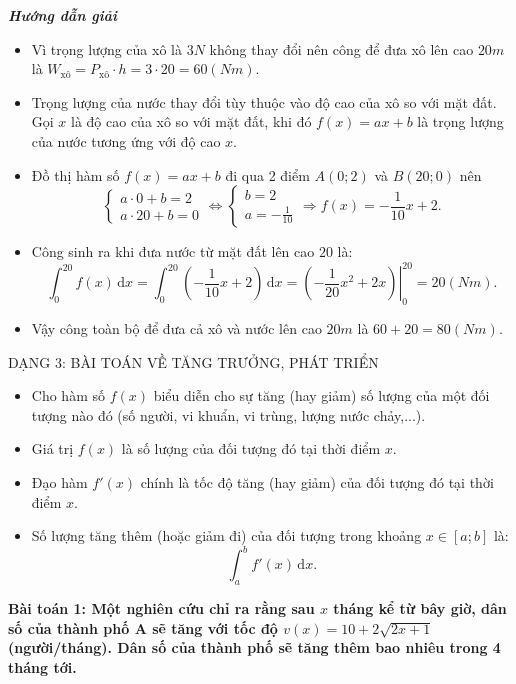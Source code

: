 \documentclass[12pt,a4paper]{article}
\newcommand{\dd}{\,\mathrm{d}}
\newcommand{\solution}{\begin{center}\textbf{\textit{Hướng dẫn giải}}\end{center}\par}
\begin{document}
\solution
\begin{itemize}
\item Vì trọng lượng của xô là $3N$ không thay đổi nên công để đưa xô lên cao $20m$ là
$W_{\text{xô}}=P_{\text{xô}}\cdot h=3\cdot20=60(Nm)$.
\item Trọng lượng của nước thay đổi tùy thuộc vào độ cao của xô so với mặt đất. Gọi $x$ là độ cao của xô so với mặt đất, khi đó $f(x)=ax+b$ là trọng lượng của nước tương ứng với độ cao $x$.
\item Đồ thị hàm số $f(x)=ax+b$ đi qua 2 điểm $A(0;2)$ và $B(20;0)$ nên
\[
\begin{cases}a\cdot0+b=2\\a\cdot20+b=0\end{cases}
\Longleftrightarrow
\begin{cases}b=2\\a=-\frac1{10}\end{cases}
\Rightarrow f(x)=-\frac1{10}x+2.
\]
\item Công sinh ra khi đưa nước từ mặt đất lên cao $20$ là:
\[
\int_0^{20}f(x)\dd x=\int_0^{20}\left(-\frac1{10}x+2\right)\dd x
=\left.\left(-\frac1{20}x^2+2x\right)\right|_0^{20}=20(Nm).
\]
\item Vậy công toàn bộ để đưa cả xô và nước lên cao $20m$ là $60+20=80(Nm)$.
\end{itemize}

\begin{dangbox}DẠNG 3: BÀI TOÁN VỀ TĂNG TRƯỞNG, PHÁT TRIỂN\end{dangbox}

\begin{itemize}
\item Cho hàm số $f(x)$ biểu diễn cho sự tăng (hay giảm) số lượng của một đối tượng nào đó
(số người, vi khuẩn, vi trùng, lượng nước chảy,...).
\item Giá trị $f(x)$ là số lượng của đối tượng đó tại thời điểm $x$.
\item Đạo hàm $f'(x)$ chính là tốc độ tăng (hay giảm) của đối tượng đó tại thời điểm $x$.
\item Số lượng tăng thêm (hoặc giảm đi) của đối tượng trong khoảng $x\in[a;b]$ là:
\[
\int_a^b f'(x)\dd x.
\]
\end{itemize}

\textbf{Bài toán 1: Một nghiên cứu chỉ ra rằng sau $x$ tháng kể từ bây giờ, dân số của thành phố A sẽ tăng với tốc độ $v(x)=10+2\sqrt{2x+1}$ (người/tháng). Dân số của thành phố sẽ tăng thêm bao nhiêu trong 4 tháng tới.}\par\medskip
\end{document}
